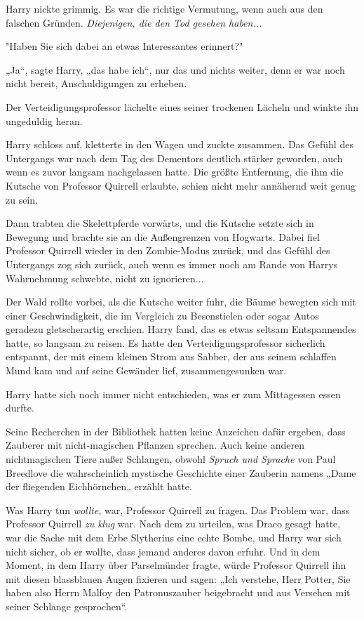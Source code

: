 {Harry nickte grimmig. Es war die richtige Vermutung, wenn auch aus den falschen Gründen. \emph{Diejenigen, die den Tod gesehen haben...}

"Haben Sie sich dabei an etwas Interessantes erinnert?"

„Ja“, sagte Harry, „das habe ich“, nur das und nichts weiter, denn er war noch nicht bereit, Anschuldigungen zu erheben.

Der Verteidigungsprofessor lächelte eines seiner trockenen Lächeln und winkte ihn ungeduldig heran.

Harry schloss auf, kletterte in den Wagen und zuckte zusammen. Das Gefühl des Untergangs war nach dem Tag des Dementors deutlich stärker geworden, auch wenn es zuvor langsam nachgelassen hatte. Die größte Entfernung, die ihm die Kutsche von Professor Quirrell erlaubte, schien nicht mehr annähernd weit genug zu sein.

Dann trabten die Skelettpferde vorwärts, und die Kutsche setzte sich in Bewegung und brachte sie an die Außengrenzen von Hogwarts. Dabei fiel Professor Quirrell wieder in den Zombie-Modus zurück, und das Gefühl des Untergangs zog sich zurück, auch wenn es immer noch am Rande von Harrys Wahrnehmung schwebte, nicht zu ignorieren...

Der Wald rollte vorbei, als die Kutsche weiter fuhr, die Bäume bewegten sich mit einer Geschwindigkeit, die im Vergleich zu Besenstielen oder sogar Autos geradezu gletscherartig erschien. Harry fand, das es etwas seltsam Entspannendes hatte, so langsam zu reisen. Es hatte den Verteidigungsprofessor sicherlich entspannt, der mit einem kleinen Strom aus Sabber, der aus seinem schlaffen Mund kam und auf seine Gewänder lief, zusammengesunken war.

Harry hatte sich noch immer nicht entschieden, was er zum Mittagessen essen durfte.

Seine Recherchen in der Bibliothek hatten keine Anzeichen dafür ergeben, dass Zauberer mit nicht-magischen Pflanzen sprechen. Auch keine anderen nichtmagischen Tiere außer Schlangen, obwohl \emph{Spruch und Sprache} von Paul Breedlove die wahrscheinlich mystische Geschichte einer Zauberin namens „Dame der fliegenden Eichhörnchen„ erzählt hatte.

Was Harry tun \emph{wollte}, war, Professor Quirrell zu fragen. Das Problem war, dass Professor Quirrell \emph{zu klug} war. Nach dem zu urteilen, was Draco gesagt hatte, war die Sache mit dem Erbe Slytherins eine echte Bombe, und Harry war sich nicht sicher, ob er wollte, dass jemand anderes davon erfuhr. Und in dem Moment, in dem Harry über Parselmünder fragte, würde Professor Quirrell ihn mit diesen blassblauen Augen fixieren und sagen: „Ich verstehe, Herr Potter, Sie haben also Herrn Malfoy den Patronuszauber beigebracht und aus Versehen mit seiner Schlange gesprochen“.

}
